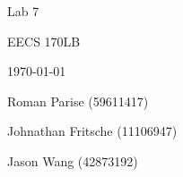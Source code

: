 \centering
\vspace{2.5cm}
{\huge Lab 7 \par}
{\Large EECS 170LB \par}
{\Large \today \par}
\vspace{1cm}
{\large Roman Parise (59611417) \par}
{\large Johnathan Fritsche (11106947) \par}
{\large Jason Wang (42873192) \par}
\vspace{1cm}
